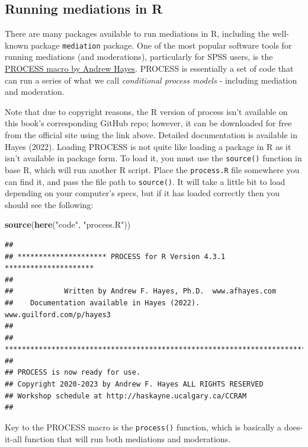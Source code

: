 \documentclass[
]{book}
\newenvironment{Shaded}{\begin{snugshade}}{\end{snugshade}}
\newcommand{\FunctionTok}[1]{\textcolor[rgb]{0.13,0.29,0.53}{\textbf{#1}}}
\newcommand{\NormalTok}[1]{#1}
\newcommand{\StringTok}[1]{\textcolor[rgb]{0.31,0.60,0.02}{#1}}
\begin{document}
\subsection{Running mediations in R}\label{running-mediations-in-r}

There are many packages available to run mediations in R, including the well-known package \texttt{mediation} package. One of the most popular software tools for running mediations (and moderations), particularly for SPSS users, is the \href{https://processmacro.org/index.html}{PROCESS macro by Andrew Hayes}. PROCESS is essentially a set of code that can run a series of what we call \emph{conditional process models} - including mediation and moderation.

Note that due to copyright reasons, the R version of process isn't available on this book's corresponding GitHub repo; however, it can be downloaded for free from the official site using the link above. Detailed documentation is available in Hayes (2022). Loading PROCESS is not quite like loading a package in R as it isn't available in package form. To load it, you must use the \texttt{source()} function in base R, which will run another R script. Place the \texttt{process.R} file somewhere you can find it, and pass the file path to \texttt{source()}. It will take a little bit to load depending on your computer's specs, but if it has loaded correctly then you should see the following:

\begin{Shaded}
\begin{Highlighting}[]
\FunctionTok{source}\NormalTok{(}\FunctionTok{here}\NormalTok{(}\StringTok{"code"}\NormalTok{, }\StringTok{"process.R"}\NormalTok{))}
\end{Highlighting}
\end{Shaded}

\begin{verbatim}
## 
## ********************* PROCESS for R Version 4.3.1 ********************* 
##  
##            Written by Andrew F. Hayes, Ph.D.  www.afhayes.com              
##    Documentation available in Hayes (2022). www.guilford.com/p/hayes3   
##  
## *********************************************************************** 
##  
## PROCESS is now ready for use.
## Copyright 2020-2023 by Andrew F. Hayes ALL RIGHTS RESERVED
## Workshop schedule at http://haskayne.ucalgary.ca/CCRAM
## 
\end{verbatim}

Key to the PROCESS macro is the \texttt{process()} function, which is basically a does-it-all function that will run both mediations and moderations.
\end{document}
